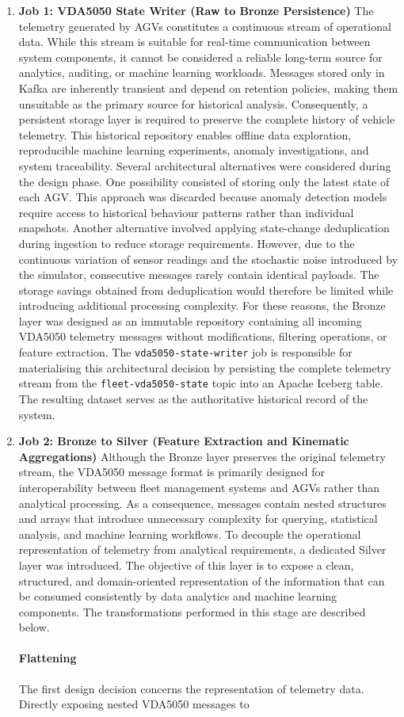 \begin{enumerate}
    \item \textbf{Job 1: VDA5050 State Writer (Raw to Bronze Persistence)} The telemetry generated by AGVs constitutes a continuous stream of operational data. While this stream is suitable for real-time communication between system components, it cannot be considered a reliable long-term source for analytics, auditing, or machine learning workloads. Messages stored only in Kafka are inherently transient and depend on retention policies, making them unsuitable as the primary source for historical analysis. Consequently, a persistent storage layer is required to preserve the complete history of vehicle telemetry. This historical repository enables offline data exploration, reproducible machine learning experiments, anomaly investigations, and system traceability. Several architectural alternatives were considered during the design phase. One possibility consisted of storing only the latest state of each AGV. This approach was discarded because anomaly detection models require access to historical behaviour patterns rather than individual snapshots. Another alternative involved applying state-change deduplication during ingestion to reduce storage requirements. However, due to the continuous variation of sensor readings and the stochastic noise introduced by the simulator, consecutive messages rarely contain identical payloads. The storage savings obtained from deduplication would therefore be limited while introducing additional processing complexity. For these reasons, the Bronze layer was designed as an immutable repository containing all incoming VDA5050 telemetry messages without modifications, filtering operations, or feature extraction. The \texttt{vda5050-state-writer} job is responsible for materialising this architectural decision by persisting the complete telemetry stream from the \texttt{fleet-vda5050-state} topic into an Apache Iceberg table. The resulting dataset serves as the authoritative historical record of the system. \item \textbf{Job 2: Bronze to Silver (Feature Extraction and Kinematic Aggregations)} Although the Bronze layer preserves the original telemetry stream, the VDA5050 message format is primarily designed for interoperability between fleet management systems and AGVs rather than analytical processing. As a consequence, messages contain nested structures and arrays that introduce unnecessary complexity for querying, statistical analysis, and machine learning workflows. To decouple the operational representation of telemetry from analytical requirements, a dedicated Silver layer was introduced. The objective of this layer is to expose a clean, structured, and domain-oriented representation of the information that can be consumed consistently by data analytics and machine learning components. The transformations performed in this stage are described below. \paragraph{Flattening} The first design decision concerns the representation of telemetry data. Directly exposing nested VDA5050 messages to 
\end{enumerate}
